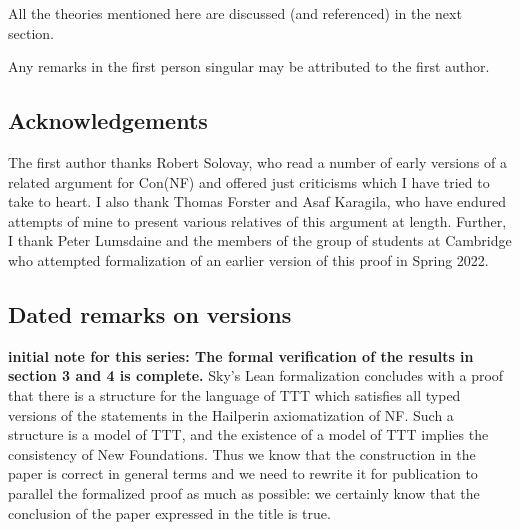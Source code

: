 \documentclass[112pt]{article}
\begin{document}
All the theories mentioned here are discussed (and referenced) in the next section.

Any remarks in the first person singular may be attributed to the first author.

\subsection{Acknowledgements}

The first author thanks Robert Solovay, who read a number of early versions of a related argument for Con(NF) and offered just criticisms which I have tried to take to heart.  I also thank Thomas Forster and Asaf Karagila, who have endured attempts of mine to present various relatives of this argument at length.  Further, I thank Peter Lumsdaine
and the members of the group of students at Cambridge who attempted formalization of an earlier version of this proof in Spring 2022.

\subsection{Dated remarks on versions}

{\bf initial note for this series:  The formal verification of the results in section 3 and 4 is complete.} Sky's Lean formalization concludes with a proof that there is a structure for the language of TTT which satisfies all typed versions of the statements
in the Hailperin axiomatization of NF.  Such a structure is a model of TTT, and the existence of a model of TTT implies the consistency of New Foundations.  Thus we know that the construction in the paper is correct in general terms and we need to rewrite it for publication to parallel the formalized proof as much as possible:  we certainly know that the conclusion of the paper expressed in the title is true.
\end{document}
